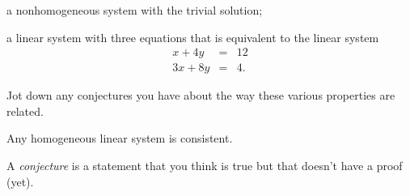\documentclass[hidelinks,12pt,handout]{ximera}
\begin{document}
\begin{question}
a nonhomogeneous system with the trivial solution;
\vfill
\end{question}

\begin{question} a linear system with three equations that is equivalent to the linear system
	\begin{eqnarray*} x + 4 y & = & 12 \\
				   3x + 8y &=&  4.
	\end{eqnarray*}
	\vfill
\end{question}

\begin{question} Jot down any conjectures you have about the way these various properties are related.

\begin{prompt}
	\begin{freeResponse}
			Any homogeneous linear system is consistent.
	\end{freeResponse}
\end{prompt}

\begin{hint} A \textit{conjecture} is a statement that you think is true but that doesn't have a proof (yet). 
\end{hint}
\vfill
\end{question}
\end{document}
